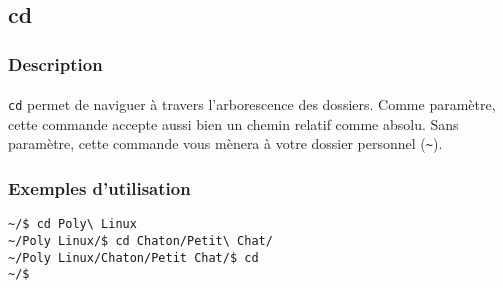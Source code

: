 \subsection{cd}
\subsubsection*{Description}

\paragraph{} \texttt{cd} permet de naviguer à travers l'arborescence des
dossiers. Comme paramètre, cette commande accepte aussi bien un chemin relatif
comme absolu. Sans paramètre, cette commande vous mènera à votre dossier
personnel (\texttt{\~}).

\subsubsection*{Exemples d'utilisation}

\begin{lstlisting}
~/$ cd Poly\ Linux
~/Poly Linux/$ cd Chaton/Petit\ Chat/
~/Poly Linux/Chaton/Petit Chat/$ cd
~/$
\end{lstlisting}
